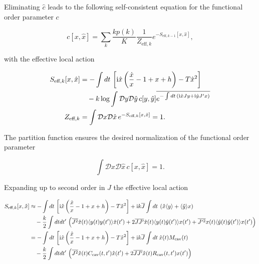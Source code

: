 \documentclass[
    preprint,
    linenumbers,
    amsmath,amssymb,amsfonts,
    aps, physrev,
    superscriptaddress,
    10pt,
    bibnotes
    ]{revtex4-2}
\begin{document}
Eliminating $\hat{c}$ leads to the following self-consistent equation
for the functional order parameter $c$

\begin{equation}
c[x,\hat{x}]=\sum_{k}\frac{kp(k)}{K}\frac{1}{Z_{\text{eff},k}}e^{-S_{\text{eff},k-1}[x,\hat{x}]},
\end{equation}

with the effective local action

\begin{subequations}
\begin{align}
S_{\text{eff},k}[x,\hat{x}] & =-\int dt\,\left[{\rm i}\hat{x}\left(\frac{\dot{x}}{x}-1+x+h\right)-T\hat{x}^{2}\right]\nonumber \\
 & \quad-k\log\int\mathcal{D}y\mathcal{D}\hat{y}\,c[y,\hat{y}]\overline{e^{-\int dt\,\left({\rm i}\hat{x}Jy+{\rm i}\hat{y}J'x\right)}}\\
Z_{\text{eff},k} & =\int\mathcal{D}x\mathcal{D}\hat{x}\,e^{-S_{\text{eff},k}[x,\hat{x}]}=1.
\end{align}
\end{subequations}

The partition function ensures the desired normalization of the functional
order parameter

\begin{equation}
\int\mathcal{D}x\mathcal{D}\hat{x}\,c[x,\hat{x}]=1.
\end{equation}

Expanding up to second order in $J$ the effective local action

\begin{subequations}
\begin{align}
S_{\text{eff},k}[x,\hat{x}] & \approx-\int dt\,\left[{\rm i}\hat{x}\left(\frac{\dot{x}}{x}-1+x+h\right)-T\hat{x}^{2}\right]+{\rm i}k\overline{J}\int dt\:\left(\hat{x}\langle y\rangle+\langle\hat{y}\rangle x\right)\nonumber \\
 & \quad-\frac{k}{2}\int dtdt'\,\left(\overline{J^{2}}\hat{x}(t)\langle y(t)y(t')\rangle\hat{x}(t')+2\overline{JJ'}\hat{x}(t)\langle y(t)\hat{y}(t')\rangle x(t')+\overline{J'{}^{2}}x(t)\langle\hat{y}(t)\hat{y}(t')\rangle x(t')\right)\\
 & =-\int dt\,\left[{\rm i}\hat{x}\left(\frac{\dot{x}}{x}-1+x+h\right)-T\hat{x}^{2}\right]+{\rm i}k\overline{J}\int dt\:\hat{x}(t)M_{\text{cav}}(t)\nonumber \\
 & \quad-\frac{k}{2}\int dtdt'\,\left(\overline{J^{2}}\hat{x}(t)C_{\text{cav}}(t,t')\hat{x}(t')+2\overline{JJ'}\hat{x}(t)R_{\text{cav}}(t,t')x(t')\right)
\end{align}
\end{subequations}
\end{document}
